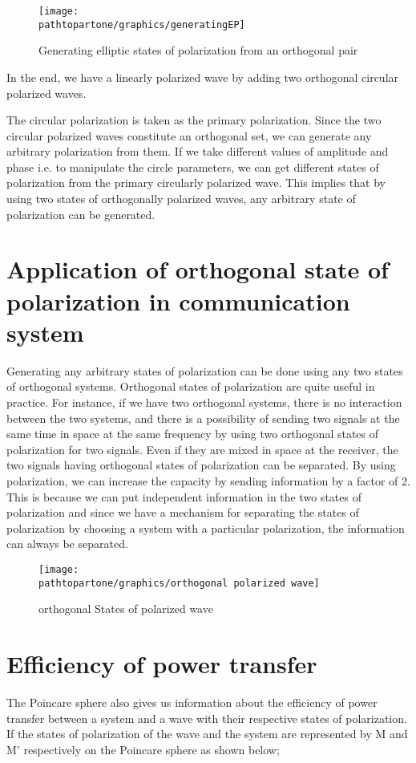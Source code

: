 \begin{figure}[h]
\centering
\texttt{[image: \\pathtopartone/graphics/generatingEP]}
\caption{Generating elliptic states of polarization from an orthogonal pair}
\label{fig:linear-polarized}
\end{figure}

In the end, we have a linearly polarized wave by adding two orthogonal circular polarized waves.

The circular polarization is taken as the primary polarization. Since the two circular polarized waves constitute an orthogonal set, we can generate any arbitrary polarization from them. If we take different values of amplitude and phase i.e. to manipulate the circle parameters, we can get different states of polarization from the primary circularly polarized wave. This implies that by using two states of orthogonally polarized waves, any arbitrary state of polarization can be generated.

\section{Application of orthogonal state of polarization in communication system}	
Generating any arbitrary states of polarization can be done using any two states of orthogonal systems. Orthogonal states of polarization are quite useful in practice. For instance, if we have two orthogonal systems, there is no interaction between the two systems, and there is a possibility of sending two signals at the same time in space at the same frequency by using two orthogonal states of polarization for two signals. Even if they are mixed in space at the receiver, the two signals having orthogonal states of polarization can be separated. By using polarization, we can increase the capacity by sending information by a factor of 2. This is because we can put independent information in the two states of polarization and since we have a mechanism for separating the states of polarization by choosing a system with a particular polarization, the information can always be separated.	
\begin{figure}[h]
\centering
\texttt{[image: \\pathtopartone/graphics/orthogonal polarized wave]}
\caption{orthogonal States of polarized wave}
\label{fig:orthogonal-polarized-wave}
\end{figure}


\section{Efficiency of power transfer}
The Poincare sphere also gives us information about the efficiency of power transfer between a system and a wave with their respective states of polarization. If the states of polarization of the wave and the system are represented by M and M' respectively on the Poincare sphere as shown below;

